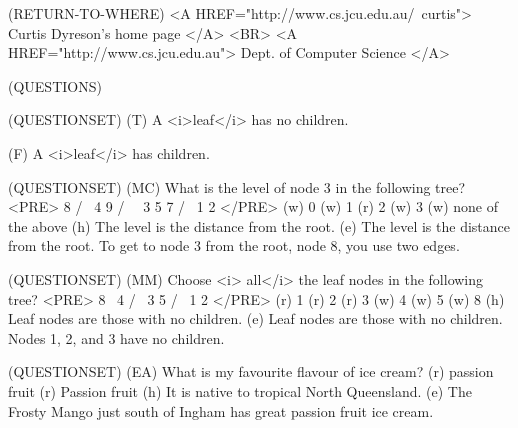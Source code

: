 (RETURN-TO-WHERE) 
<A HREF="http://www.cs.jcu.edu.au/~curtis">
Curtis Dyreson's home page
</A> <BR>
<A HREF="http://www.cs.jcu.edu.au">
Dept. of Computer Science
</A>

(QUESTIONS) 

(QUESTIONSET)
(T) A <i>leaf</i> has no children.

(F) A <i>leaf</i> has children.

(QUESTIONSET)
(MC) What is the level of node 3 in the following tree?
<PRE>
     8 
    / \
   4   9
  / \   \
 3   5   7
    / \
   1   2
</PRE>
(w) 0
(w) 1
(r) 2
(w) 3
(w) none of the above
(h) The level is the distance from the root.
(e) The level is the distance from the root.
To get to node 3 from the root, node 8, you use two edges.

(QUESTIONSET)
(MM) Choose <i> all</i> the leaf nodes in the following tree?
<PRE>
 8 
  \
   4
  / \
 3   5
    / \
   1   2
</PRE>
(r) 1
(r) 2
(r) 3
(w) 4
(w) 5
(w) 8
(h) Leaf nodes are those with no children.
(e) Leaf nodes are those with no children.
Nodes 1, 2, and 3 have no children.
 
(QUESTIONSET)
(EA) What is my favourite flavour of ice cream?
(r) passion fruit
(r) Passion fruit
(h) It is native to tropical North Queensland.
(e) The Frosty Mango just south of Ingham has great passion fruit 
ice cream.
